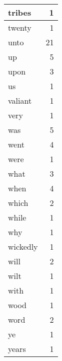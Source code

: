 \begin{center}
\begin{longtable}{l|r}
tribes & 1 \\ \hline
twenty & 1 \\ \hline
unto & 21 \\ \hline
up & 5 \\ \hline
upon & 3 \\ \hline
us & 1 \\ \hline
valiant & 1 \\ \hline
very & 1 \\ \hline
was & 5 \\ \hline
went & 4 \\ \hline
were & 1 \\ \hline
what & 3 \\ \hline
when & 4 \\ \hline
which & 2 \\ \hline
while & 1 \\ \hline
why & 1 \\ \hline
wickedly & 1 \\ \hline
will & 2 \\ \hline
wilt & 1 \\ \hline
with & 1 \\ \hline
wood & 1 \\ \hline
word & 2 \\ \hline
ye & 1 \\ \hline
years & 1 \\ \hline
\end{longtable}
\end{center}



\normalsize



